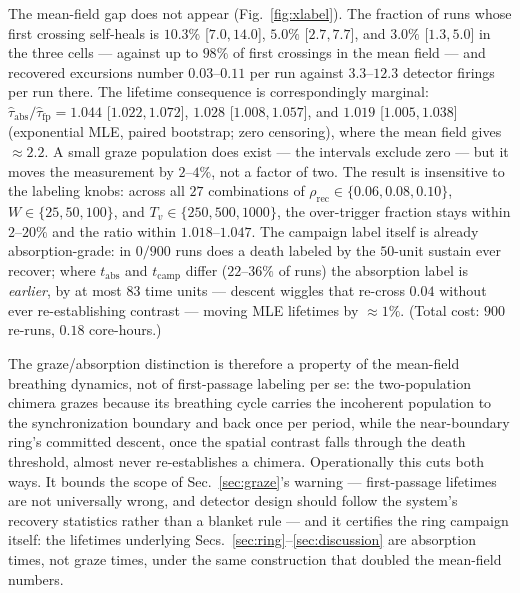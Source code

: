 \documentclass[pdflatex,sn-mathphys,Numbered]{sn-jnl}
\begin{document}
The mean-field gap does not appear (Fig.~\ref{fig:xlabel}). The fraction of
runs whose first crossing self-heals is $10.3\%$ [$7.0, 14.0$], $5.0\%$
[$2.7, 7.7$], and $3.0\%$ [$1.3, 5.0$] in the three cells --- against up to
$98\%$ of first crossings in the mean field --- and recovered excursions
number $0.03$--$0.11$ per run against $3.3$--$12.3$ detector firings per
run there. The lifetime consequence is correspondingly marginal:
$\hat\tau_{\mathrm{abs}}/\hat\tau_{\mathrm{fp}} = 1.044$ [$1.022, 1.072$],
$1.028$ [$1.008, 1.057$], and $1.019$ [$1.005, 1.038$] (exponential MLE,
paired bootstrap; zero censoring), where the mean field gives
${\approx}2.2$. A small graze population does exist --- the intervals
exclude zero --- but it moves the measurement by $2$--$4\%$, not a factor
of two. The result is insensitive to the labeling knobs: across all $27$
combinations of $\rho_{\mathrm{rec}} \in \{0.06, 0.08, 0.10\}$,
$W \in \{25, 50, 100\}$, and $T_v \in \{250, 500, 1000\}$, the over-trigger
fraction stays within $2$--$20\%$ and the ratio within $1.018$--$1.047$.
The campaign label itself is already absorption-grade: in $0/900$ runs does
a death labeled by the $50$-unit sustain ever recover; where
$t_{\mathrm{abs}}$ and $t_{\mathrm{camp}}$ differ ($22$--$36\%$ of runs)
the absorption label is \emph{earlier}, by at most $83$ time units ---
descent wiggles that re-cross $0.04$ without ever re-establishing contrast
--- moving MLE lifetimes by ${\approx}1\%$. (Total cost: $900$ re-runs,
$0.18$ core-hours.)

The graze/absorption distinction is therefore a property of the mean-field
breathing dynamics, not of first-passage labeling per se: the
two-population chimera grazes because its breathing cycle carries the
incoherent population to the synchronization boundary and back once per
period, while the near-boundary ring's committed descent, once the spatial
contrast falls through the death threshold, almost never re-establishes a
chimera. Operationally this cuts both ways. It bounds the scope of
Sec.~\ref{sec:graze}'s warning --- first-passage lifetimes are not
universally wrong, and detector design should follow the system's recovery
statistics rather than a blanket rule --- and it certifies the ring
campaign itself: the lifetimes underlying
Secs.~\ref{sec:ring}--\ref{sec:discussion} are absorption times, not
graze times, under the same construction that doubled the mean-field
numbers.
\end{document}
